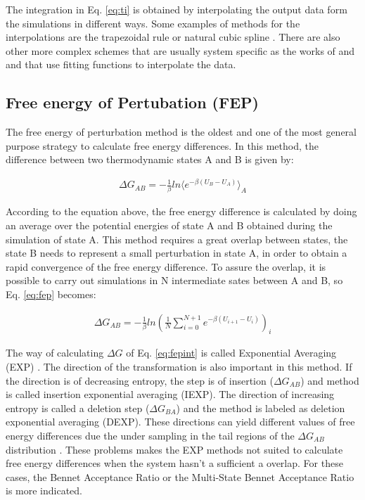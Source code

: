 The integration in Eq. \eqref{eq:ti} is obtained by interpolating the output data form the simulations in different ways. Some examples of methods for the interpolations are the trapezoidal rule or natural cubic spline \cite{bareva}. There are also other more complex schemes that are usually system specific as the works of  and  and that use fitting functions to interpolate the data. 

\subsection{Free energy of Pertubation (FEP)}

The free energy of perturbation method \cite{zwanzig1954} is the oldest and one of the most general purpose strategy to calculate free energy differences. In this method, the difference between two thermodynamic states A and B is given by:

\begin{equation}
\label{eq:fep}
\begin{aligned}
\Delta G_{AB} = -\frac{1}{\beta} ln \langle{e^{-\beta (U_{B}-U_{A})}}\rangle_{A}
\end{aligned}
\end{equation}

According to the equation above, the free energy difference is calculated by doing an average over the potential energies of state A and B obtained during the simulation of state A. This method requires a great overlap between states, the state B needs to represent a small perturbation in state A, in order to obtain a rapid convergence of the free energy difference. To assure the overlap, it is possible to carry out simulations in N intermediate sates between A and B, so Eq. \eqref{eq:fep} becomes:

\begin{equation}
\label{eq:fepint}
\begin{aligned}
\Delta G_{AB} = -\frac{1}{\beta} ln \left(\frac{1}{N}\sum_{i=0}^{N+1}
{e^{-\beta (U_{i+1}-U_{i})}}\right)_{i}
\end{aligned}
\end{equation}

The way of calculating $\Delta G$ of Eq. \eqref{eq:fepint} is called Exponential Averaging (EXP) \cite{zwanzig1955,bareva}. The direction of the transformation is also important in this method. If the direction is of decreasing entropy, the step is of insertion ($\Delta G_{AB}$) and method is called insertion exponential averaging (IEXP). The direction of increasing entropy is  called a deletion step ($\Delta G_{BA}$) and the method is labeled as deletion exponential averaging (DEXP). These directions can yield different values of free energy differences due the under sampling in the tail regions of the $\Delta G_{AB}$ distribution \cite{klimovich,pohorille2010}. These problems makes the EXP methods not suited to calculate free energy differences when the system hasn't a sufficient a overlap. For these cases, the Bennet Acceptance Ratio or the Multi-State Bennet Acceptance Ratio is more indicated.   


